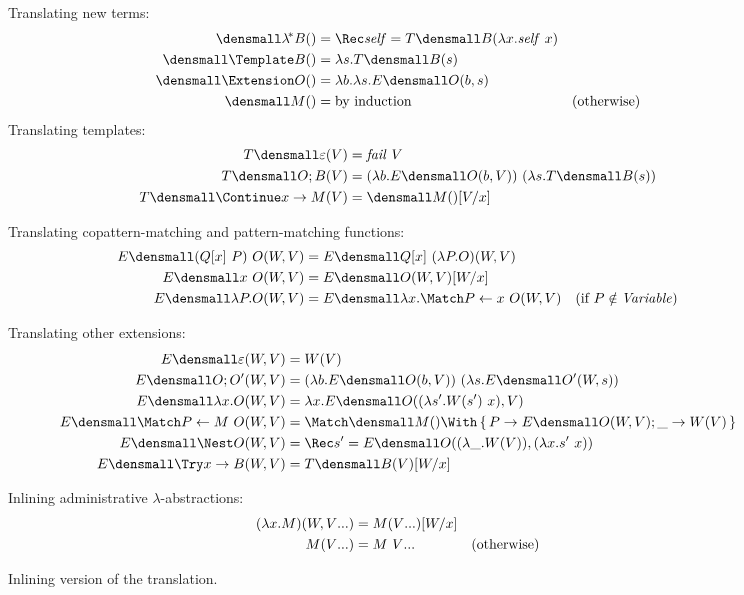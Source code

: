 \documentclass[runningheads]{llncs}
\begin{document}
\begin{figure}
\centering
Translating new terms:  
\begin{align*}
  \den{\lamstar B}()
  &=
  \Rec \mathit{self} = T\den{B}(\lambda x. \mathit{self} ~ x)
  \\
  \den{\Template B}()
  &=
  \lambda s. T\den{B}(s)
  \\
  \den{\Extension O}()
  &=
  \lambda b. \lambda s. E\den{O}(b, s)
  \\
  \den{M}()
  &=
  \text{by induction}
  &(\text{otherwise})
\end{align*}
Translating templates:
\begin{align*}
  T\den{\varepsilon}(V)
  &=
  \mathit{fail}~V
  \\
  T\den{O; B}(V)
  &=
  (\lambda b. E\den{O}(b, V)) ~ (\lambda s. T\den{B}(s))
  \\
  T\den{\Continue x \to M}(V)
  &=
  \den{M}()\subst{x}{V}
\end{align*}

Translating copattern-matching and pattern-matching functions:
\begin{align*}
  E\den{(Q[x] ~ P) ~ O}(W, V)
  &=
  E\den{Q[x] ~ (\lambda P. O)}(W, V)
  \\
  E\den{x ~ O}(W, V)
  &=
  E\den{O}(W, V)\subst{x}{W}
  \\
  E\den{\lambda P. O}(W, V)
  &=
  E\den{\lambda x. \Match P \gets x ~ O}(W, V)
  &(\text{if } P \notin \mathit{Variable})
\end{align*}

Translating other extensions:
\begin{align*}
  E\den{\varepsilon}(W, V)
  &=
  W(V)
  \\
  E\den{O; O'}(W, V)
  &=
  (\lambda b. E\den{O}(b, V)) ~ (\lambda s. E\den{O'}(W, s))
  \\
  E\den{\lambda x. O}(W, V)
  &=
  \lambda x. E\den{O}((\lambda s'. W(s') ~ x), V)
  \\
  E\den{\Match P \gets M ~ O}(W, V)
  &=
  \Match \den{M}() \With
  \set{P \to E\den{O}(W, V); \_ \to W(V)}
  \\
  E\den{\Nest O}(W, V)
  &=
  \Rec s' = E\den{O}((\lambda \_. W(V)), (\lambda x. s' ~ x))
  \\
  E\den{\Try x \to B}(W, V)
  &=
  T\den{B}(V)\subst{x}{W}
\end{align*}

Inlining administrative $\lambda$-abstractions:
\begin{align*}
  (\lambda x. M)(W, \many{V})
  &=
  M(\many{V})\subst{x}{W}
  \\
  M(\many{V})
  &=
  M ~ \many{V}
  &(\text{otherwise})
\end{align*}

\caption{Inlining version of the translation.}
\label{fig:inline-translation}
\end{figure}
\end{document}
